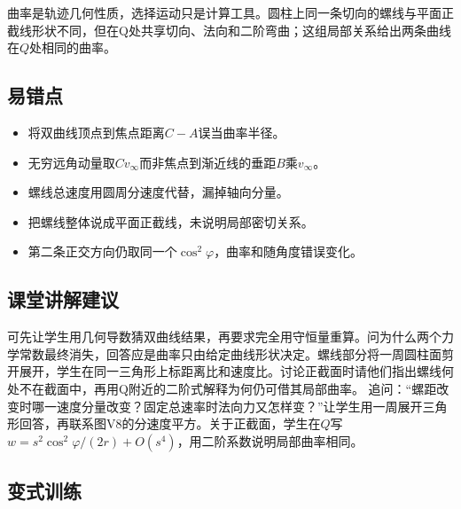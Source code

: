 \documentclass[UTF8,fontset=fandol,a4paper,11pt]{ctexart}
\begin{document}
曲率是轨迹几何性质，选择运动只是计算工具。圆柱上同一条切向的螺线与平面正截线形状不同，但在Q处共享切向、法向和二阶弯曲；这组局部关系给出两条曲线在$Q$处相同的曲率。



\subsection*{易错点}

\begin{itemize}
\item 将双曲线顶点到焦点距离$C-A$误当曲率半径。
\item 无穷远角动量取$Cv_\infty$而非焦点到渐近线的垂距$B$乘$v_\infty$。
\item 螺线总速度用圆周分速度代替，漏掉轴向分量。
\item 把螺线整体说成平面正截线，未说明局部密切关系。
\item 第二条正交方向仍取同一个$\cos^2\varphi$，曲率和随角度错误变化。
\end{itemize}



\subsection*{课堂讲解建议}

可先让学生用几何导数猜双曲线结果，再要求完全用守恒量重算。问为什么两个力学常数最终消失，回答应是曲率只由给定曲线形状决定。螺线部分将一周圆柱面剪开展开，学生在同一三角形上标距离比和速度比。讨论正截面时请他们指出螺线何处不在截面中，再用Q附近的二阶式解释为何仍可借其局部曲率。 追问：“螺距改变时哪一速度分量改变？固定总速率时法向力又怎样变？”让学生用一周展开三角形回答，再联系图V8的分速度平方。关于正截面，学生在$Q$写$w=s^2\cos^2\varphi/(2r)+O(s^4)$，用二阶系数说明局部曲率相同。



\subsection*{变式训练}
\end{document}
